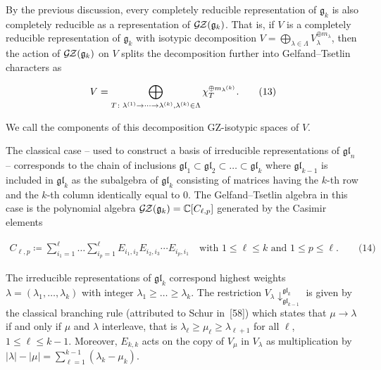 \documentclass[10pt,a4paper]{article}
\begin{document}
By the previous discussion, every completely reducible representation of $\mathfrak{g}_{k}$ is also completely reducible as a representation of $\mathcal{G}\hskip-1.00006pt\mathcal{Z}(\mathfrak{g}_{k})$.
That is, if $V$ is a completely reducible representation of $\mathfrak{g}_{k}$ with isotypic decomposition $V=\bigoplus_{\lambda\in\Lambda}V_{\lambda}^{\oplus m_{\lambda}}$, then the action of $\mathcal{G}\hskip-1.00006pt\mathcal{Z}(\mathfrak{g}_{k})$ on $V$ splits the decomposition further into Gelfand–Tsetlin characters as



\[\begin{aligned}
\displaystyle V=\bigoplus\limits_{T\colon\lambda^{(1)}\to\dots\to\lambda^{(k)},\lambda^{(k)}\in\Lambda}\chi_{T}^{\oplus m_{\smash{\lambda^{(k)}}}}.\qquad\text{(13)}
\end{aligned}\]


We call the components of this decomposition GZ-isotypic spaces of $V$.





The classical case – used to construct a basis of irreducible representations of $\mathfrak{gl}_{n}$ – corresponds to the chain of inclusions $\mathfrak{gl}_{1}\subset\mathfrak{gl}_{2}\subset\dots\subset\mathfrak{gl}_{k}$ where $\mathfrak{gl}_{k-1}$ is included in $\mathfrak{gl}_{k}$ as the subalgebra of $\mathfrak{gl}_{k}$ consisting of matrices having the $k$-th row and the $k$-th column identically equal to $0$. The Gelfand–Tsetlin algebra in this case is the polynomial algebra $\mathcal{G}\hskip-1.00006pt\mathcal{Z}(\mathfrak{g}_{k})=\mathbb{C}[C_{\ell,p}]$ generated by the Casimir elements



\[\begin{aligned}
\displaystyle C_{\ell,p}\coloneqq\sum_{i_{1}=1}^{\ell}\dots\sum_{i_{p}=1}^{\ell}E_{i_{1},i_{2}}E_{i_{2},i_{3}}\cdots E_{i_{p},i_{1}}\quad\text{with }1\leq\ell\leq k\text{ and }1\leq p\leq\ell.\qquad\text{(14)}
\end{aligned}\]




The irreducible representations of $\mathfrak{gl}_{k}$ correspond highest weights $\lambda=(\lambda_{1},\dots,\lambda_{k})$ with integer $\lambda_{1}\geq\dots\geq\lambda_{k}$.
The restriction $V_{\lambda}{\downarrow}^{\mathfrak{gl}_{k}}_{\mathfrak{gl}_{k-1}}$ is given by the classical branching rule (attributed to Schur in [58]) which states that $\mu\to\lambda$ if and only if $\mu$ and $\lambda$ interleave, that is $\lambda_{\ell}\geq\mu_{\ell}\geq\lambda_{\ell+1}$ for all $\ell$, $1\leq\ell\leq k-1$.
Moreover, $E_{k,k}$ acts on the copy of $V_{\mu}$ in $V_{\lambda}$ as multiplication by $|\lambda|-|\mu|=\sum_{\ell=1}^{k-1}(\lambda_{k}-\mu_{k})$.
\end{document}
